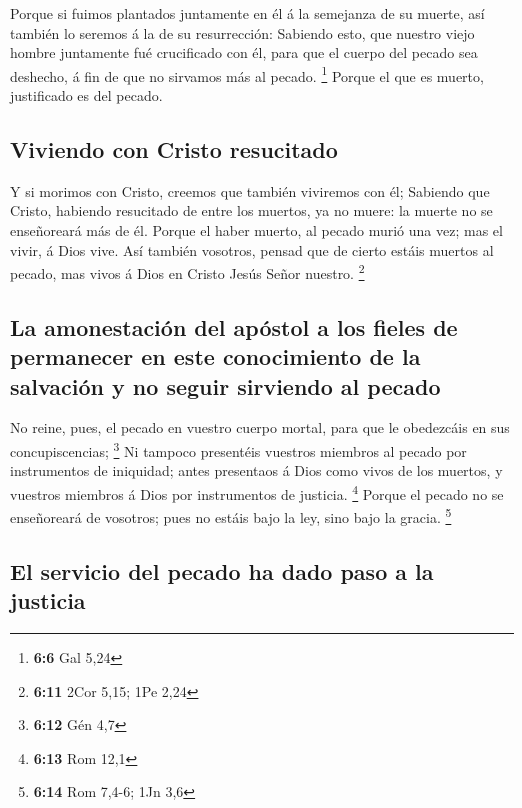  Porque si fuimos plantados juntamente en él á la semejanza
de su muerte, así también lo seremos á la de su resurrección:
 Sabiendo esto, que nuestro viejo hombre juntamente fué
crucificado con él, para que el cuerpo del pecado sea deshecho, á fin de
que no sirvamos más al pecado. \footnote{\textbf{6:6} Gal 5,24}
 Porque el que es muerto, justificado es del pecado.

\hypertarget{viviendo-con-cristo-resucitado}{%
\subsection{Viviendo con Cristo
resucitado}\label{viviendo-con-cristo-resucitado}}

 Y si morimos con Cristo, creemos que también viviremos con
él;  Sabiendo que Cristo, habiendo resucitado de entre los
muertos, ya no muere: la muerte no se enseñoreará más de él.
 Porque el haber muerto, al pecado murió una vez; mas el
vivir, á Dios vive.  Así también vosotros, pensad que de
cierto estáis muertos al pecado, mas vivos á Dios en Cristo Jesús Señor
nuestro. \footnote{\textbf{6:11} 2Cor 5,15; 1Pe 2,24}

\hypertarget{la-amonestaciuxf3n-del-apuxf3stol-a-los-fieles-de-permanecer-en-este-conocimiento-de-la-salvaciuxf3n-y-no-seguir-sirviendo-al-pecado}{%
\subsection{La amonestación del apóstol a los fieles de permanecer en
este conocimiento de la salvación y no seguir sirviendo al
pecado}\label{la-amonestaciuxf3n-del-apuxf3stol-a-los-fieles-de-permanecer-en-este-conocimiento-de-la-salvaciuxf3n-y-no-seguir-sirviendo-al-pecado}}

 No reine, pues, el pecado en vuestro cuerpo mortal, para
que le obedezcáis en sus concupiscencias; \footnote{\textbf{6:12} Gén
  4,7}  Ni tampoco presentéis vuestros miembros al pecado
por instrumentos de iniquidad; antes presentaos á Dios como vivos de los
muertos, y vuestros miembros á Dios por instrumentos de justicia.
\footnote{\textbf{6:13} Rom 12,1}  Porque el pecado no se
enseñoreará de vosotros; pues no estáis bajo la ley, sino bajo la
gracia. \footnote{\textbf{6:14} Rom 7,4-6; 1Jn 3,6}

\hypertarget{el-servicio-del-pecado-ha-dado-paso-a-la-justicia}{%
\subsection{El servicio del pecado ha dado paso a la
justicia}\label{el-servicio-del-pecado-ha-dado-paso-a-la-justicia}}

